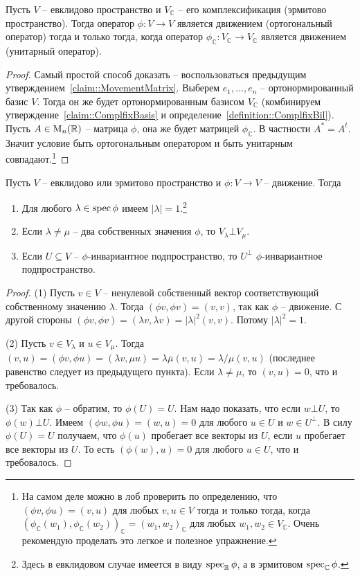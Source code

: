 \begin{claim}\label{claim::MovementComplfix}
Пусть $V$ -- евклидово пространство и $V_\mathbb C$ -- его комплексификация (эрмитово пространство). Тогда оператор $\phi \colon V\to V$ является движением (ортогональный оператор) тогда и только тогда, когда оператор $\phi_\mathbb C\colon V_\mathbb C\to V_\mathbb C$ является движением (унитарный оператор).
\end{claim}
\begin{proof}
Самый простой способ доказать -- воспользоваться предыдущим утверждением~\ref{claim::MovementMatrix}. Выберем $e_1,\ldots,e_n$ -- ортонормированный базис $V$. Тогда он же будет ортонормированным базисом $V_\mathbb C$ (комбинируем утверждение~\ref{claim::ComplfixBasis} и определение~\ref{definition::ComplfixBil}). Пусть $A\in\operatorname{M}_{n}(\mathbb R)$ -- матрица $\phi$, она же будет матрицей $\phi_\mathbb C$. В частности $A^* = A^t$. Значит условие быть ортогональным оператором и быть унитарным совпадают.\footnote{На самом деле можно в лоб проверить по определению, что $(\phi v, \phi u) = (v, u)$ для любых $v,u\in V$ тогда и только тогда, когда $(\phi_\mathbb C(w_1), \phi_\mathbb C(w_2))_\mathbb C = (w_1,w_2)_\mathbb C$ для любых $w_1,w_2\in V_\mathbb C$. Очень рекомендую проделать это легкое и полезное упражнение.}
\end{proof}


\begin{claim}\label{claim::MovmentBasicProp}
Пусть $V$ -- евклидово или эрмитово пространство и $\phi\colon V\to V$ -- движение. Тогда
\begin{enumerate}
\item Для любого $\lambda\in \operatorname{spec} \phi$ имеем $|\lambda| = 1$.\footnote{Здесь в евклидовом случае имеется в виду $\operatorname{spec}_\mathbb R \phi$, а в эрмитовом $\operatorname{spec}_\mathbb C\phi$.}
\item Если $\lambda\neq \mu$ -- два собственных значения $\phi$, то $V_\lambda \bot V_\mu$.
\item Если $U\subseteq V$ -- $\phi$-инвариантное подпространство, то $U^\bot$ $\phi$-инвариантное подпространство.
\end{enumerate}
\end{claim}
\begin{proof}
(1) Пусть $v\in V$ -- ненулевой собственный вектор соответствующий собственному значению $\lambda$. Тогда $(\phi v, \phi v) = (v, v)$, так как $\phi$ -- движение. С другой стороны $(\phi v, \phi v) = (\lambda v, \lambda v) = |\lambda|^2(v, v)$. Потому $|\lambda|^2 = 1$.

(2) Пусть $v\in V_\lambda$ и $u\in V_\mu$. Тогда $(v,u) = (\phi v, \phi u) = (\lambda v,\mu u) = \lambda \bar \mu (v, u) = \lambda/\mu(v,u)$ (последнее равенство следует из предыдущего пункта). Если $\lambda \neq \mu$, то $(v,u) = 0$, что и требовалось.

(3) Так как $\phi$ -- обратим, то $\phi(U) = U$. Нам надо показать, что если $w\bot U$, то $\phi(w)\bot U$. Имеем $(\phi w, \phi u) = (w, u) =0$ для любого $u\in U$ и $w\in U^\bot$. В силу $\phi(U) = U$ получаем, что $\phi(u)$ пробегает все векторы из $U$, если $u$ пробегает все векторы из $U$. То есть $(\phi(w), u) = 0$ для любого $u\in U$, что и требовалось.
\end{proof}